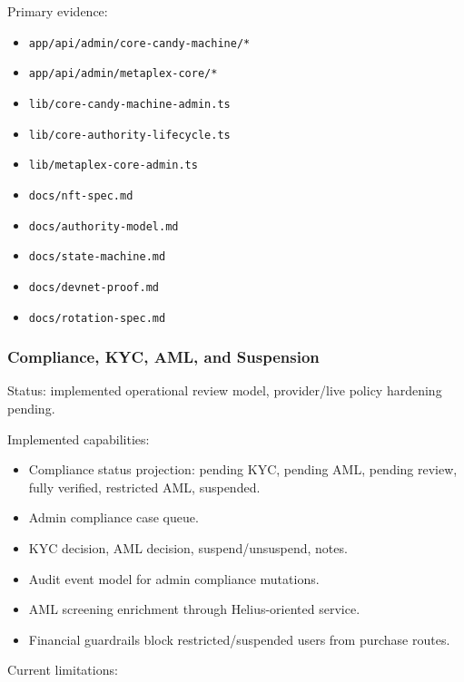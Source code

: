 \documentclass[
  10pt,
  letterpaper,
]{article}
\providecommand{\tightlist}{%
  \setlength{\itemsep}{0pt}\setlength{\parskip}{0pt}}
\let\oldtexttt\texttt
\renewcommand{\texttt}[1]{\oldtexttt{\small #1}}
\begin{document}
Primary evidence:

\begin{itemize}
\tightlist
\item
  \texttt{app/api/admin/core-candy-machine/*}
\item
  \texttt{app/api/admin/metaplex-core/*}
\item
  \texttt{lib/core-candy-machine-admin.ts}
\item
  \texttt{lib/core-authority-lifecycle.ts}
\item
  \texttt{lib/metaplex-core-admin.ts}
\item
  \texttt{docs/nft-spec.md}
\item
  \texttt{docs/authority-model.md}
\item
  \texttt{docs/state-machine.md}
\item
  \texttt{docs/devnet-proof.md}
\item
  \texttt{docs/rotation-spec.md}
\end{itemize}

\subsubsection{Compliance, KYC, AML, and
Suspension}\label{compliance-kyc-aml-and-suspension}

Status: implemented operational review model, provider/live policy
hardening pending.

Implemented capabilities:

\begin{itemize}
\tightlist
\item
  Compliance status projection: pending KYC, pending AML, pending
  review, fully verified, restricted AML, suspended.
\item
  Admin compliance case queue.
\item
  KYC decision, AML decision, suspend/unsuspend, notes.
\item
  Audit event model for admin compliance mutations.
\item
  AML screening enrichment through Helius-oriented service.
\item
  Financial guardrails block restricted/suspended users from purchase
  routes.
\end{itemize}

Current limitations:
\end{document}
